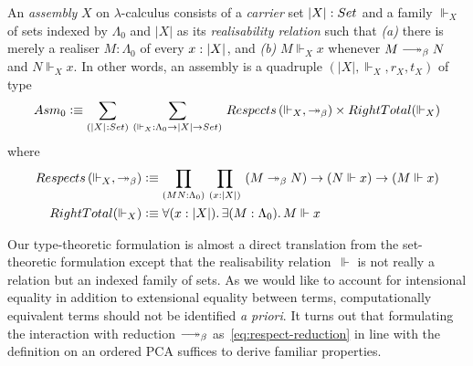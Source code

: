 \documentclass[a4paper,UKenglish,numberwithinsect,cleveref,thm-restate,draft]{lipics-v2021}
\numberwithin{equation}{section}
\theoremstyle{definition}
\theoremstyle{plain}
\begin{document}
\begin{definition}\label{def:assembly}
  An \emph{assembly} $X$ on $\lambda$-calculus consists of a \emph{carrier} set $|X| : \set$ and a family ${\Vdash_X}$ of sets indexed by $\Lambda_0$ and $|X|$ as its \emph{realisability relation} such that
  \emph{(a)} there is merely a realiser $M : \Lambda_0$ of every $x : \mathopen{}\left|X\right|_{}^{}\mathclose{}$, and
  \emph{(b)} $M \Vdash_X x$ whenever $M \reduce N$ and $N \Vdash_X x$.
  In other words, an assembly is a quadruple $(|X|, \Vdash_X, r_X, t_X)$ of type
  \[
    \Asm_0 \defeq \sm{\bproj{X} : {\set}}{\mathord{\Vdash_X}:\Lambda_0 \to |X| \to \set} 
      \mathsf{Respects}\left(\Vdash_X, \mathord{\twoheadrightarrow_\beta}\right)
      \times \mathsf{RightTotal}({\Vdash_X})
  \]
  where
  \begin{align}
    \mathsf{Respects}\left(\mathord{\Vdash_X}, \mathord{\twoheadrightarrow_\beta}\right) & \defeq\prd{M N : \Lambda_0}{x : |X|} \left(M \twoheadrightarrow_ \beta N\right) \to \left(N \Vdash x\right) \to \left(M \Vdash x\right) \label{eq:respect-reduction} \\      
    \mathsf{RightTotal}(\Vdash_X) & \defeq \fall{x : |X|}\exis{M : \Lambda_0} M \Vdash x
    \label{eq:right-total}
  \end{align}
\end{definition}

Our type-theoretic formulation is almost a direct translation from the set-theoretic formulation except that the realisability relation~$\Vdash$ is not really a relation but an indexed family of sets.
As we would like to account for intensional equality in addition to extensional equality between terms,
computationally equivalent terms should not be identified \emph{a priori}.
It turns out that formulating the interaction with reduction $\reduce$ as~\eqref{eq:respect-reduction} in line with the definition on an ordered PCA suffices to derive familiar properties.
\end{document}
